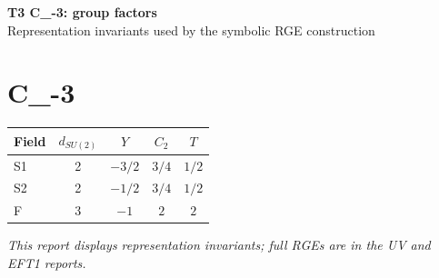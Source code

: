 \documentclass[10pt,a4paper]{article}
\begin{document}
\begin{center}
{\Large\bfseries T3 C\_-3: group factors}\\[4pt]
Representation invariants used by the symbolic RGE construction
\end{center}
\bigskip
\section*{C\_-3}
\begin{longtable}{@{}lcccc@{}}
\toprule Field & $d_{SU(2)}$ & $Y$ & $C_2$ & $T$ \\
\midrule
S1 & 2 & $-3/2$ & $3/4$ & $1/2$ \\
S2 & 2 & $-1/2$ & $3/4$ & $1/2$ \\
F & 3 & $-1$ & $2$ & $2$ \\
\bottomrule
\end{longtable}
\emph{This report displays representation invariants; full RGEs are in the UV and EFT1 reports.}
\end{document}
